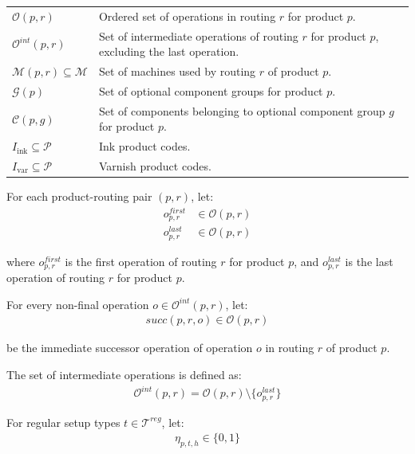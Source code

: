 \documentclass{article}
\begin{document}
\begin{longtable}{@{}L{0.32\textwidth}L{0.62\textwidth}@{}}
$\mathcal{O}(p,r)$ & Ordered set of operations in routing $r$ for product $p$. \\

$\mathcal{O}^{int}(p,r)$ & Set of intermediate operations of routing $r$ for product $p$, excluding the last operation. \\

$\mathcal{M}(p,r) \subseteq \mathcal{M}$ & Set of machines used by routing $r$ of product $p$. \\

$\mathcal{G}(p)$ & Set of optional component groups for product $p$. \\

$\mathcal{C}(p,g)$ & Set of components belonging to optional component group $g$ for product $p$. \\

$I_{\text{ink}} \subseteq \mathcal{P}$ & Ink product codes. \\

$I_{\text{var}} \subseteq \mathcal{P}$ & Varnish product codes. \\

\end{longtable}
\endgroup

For each product-routing pair $(p,r)$, let:
\begin{align}
o^{first}_{p,r} &\in \mathcal{O}(p,r) \\
o^{last}_{p,r} &\in \mathcal{O}(p,r)
\end{align}

where $o^{first}_{p,r}$ is the first operation of routing $r$ for product $p$, and $o^{last}_{p,r}$ is the last operation of routing $r$ for product $p$.

For every non-final operation $o \in \mathcal{O}^{int}(p,r)$, let:
\begin{align}
succ(p,r,o) \in \mathcal{O}(p,r)
\end{align}

be the immediate successor operation of operation $o$ in routing $r$ of product $p$.

The set of intermediate operations is defined as:
\begin{align}
\mathcal{O}^{int}(p,r)
=
\mathcal{O}(p,r) \setminus \{o^{last}_{p,r}\}
\end{align}

For regular setup types $t \in \mathcal{T}^{reg}$, let:
\begin{align}
\eta_{p,t,h} \in \{0,1\}
\end{align}
\end{document}
